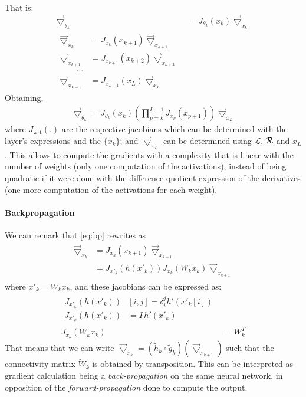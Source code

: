 That is:
\begin{align}
  \vec{\bigtriangledown}_{\theta_k} & = J_{\theta_k}(x_k) \vec{\bigtriangledown}_{x_k} \\
  \begin{split}
  \vec{\bigtriangledown}_{x_k} & = J_{x_k}(x_{k+1}) \vec{\bigtriangledown}_{x_{k+1}} \\
  \vec{\bigtriangledown}_{x_{k+1}} & = J_{x_{k+1}}(x_{k+2}) \vec{\bigtriangledown}_{x_{k+2}} \\
  \quad \quad \ldots\\
  \vec{\bigtriangledown}_{x_{L-1}} & = J_{x_{L-1}}(x_{L}) \vec{\bigtriangledown}_{x_{L}}
  \label{eq:bp}
  \end{split}
\end{align}
Obtaining,
\begin{align}
  \vec{\bigtriangledown}_{\theta_k} = J_{\theta_k}(x_k) (\prod_{p=k}^{L-1} J_{x_p}(x_{p+1})) \vec{\bigtriangledown}_{x_L}
\end{align}
where $J_{\text{wrt}}(.)$ are the respective jacobians which can be determined with the layer's expressions and the $\{x_k\}$; and $\vec{\bigtriangledown}_{x_L}$ can be determined using $\mathcal{L}$, $\mathcal{R}$ and $x_L$.
This allows to compute the gradients with a complexity that is linear with the number of weights (only one computation of the activations), instead of being quadratic if it were done with the difference quotient expression of the derivatives (one more computation of the activations for each weight).

\paragraph{Backpropagation}
We can remark that \eqref{eq:bp} rewrites as
\begin{align}
  \begin{split}
  \vec{\bigtriangledown}_{x_k} & = J_{x_k}(x_{k+1}) \vec{\bigtriangledown}_{x_{k+1}} \\ 
                               & = J_{x'_k}(h(x'_k)) J_{x_k}(W_k x_k) \vec{\bigtriangledown}_{x_{k+1}}
  \end{split}
\end{align}
where $x'_k = W_k x_k$, and these jacobians can be expressed as:
\begin{align}
  \begin{split}
  J_{x'_k}(h(x'_k)) & [i,j] = \delta_i^j h'(x'_k[i])\\
  J_{x'_k}(h(x'_k)) & = I \hspace{2pt} h'(x'_k)
  \end{split}\\
  J_{x_k}(W_k x_k) & = W_k^T
\end{align}
That means that we can write $\vec{\bigtriangledown}_{x_k} = (\widetilde{h}_k \circ \widetilde{g}_k)(\vec{\bigtriangledown}_{x_{k+1}})$ such that the connectivity matrix $\widetilde{W}_k$ is obtained by transposition. This can be interpreted as gradient calculation being a \emph{back-propagation} on the same neural network, in opposition of the \emph{forward-propagation} done to compute the output.

